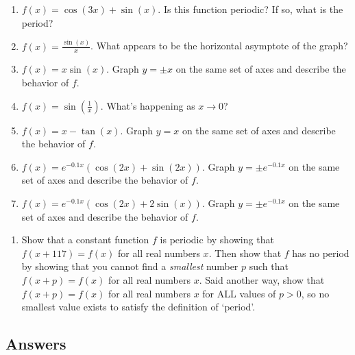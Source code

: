 \begin{enumerate}

\setcounter{enumi}{\value{HW}}

\item  $f(x) = \cos(3x) + \sin(x)$.  Is this function periodic?  If so, what is the period? \label{exploregraphsfirst}
\item  $f(x) = \frac{\sin(x)}{x}$.  What appears to be the horizontal asymptote of the graph? 
\item  $f(x) = x \sin(x)$.  Graph $y = \pm x$ on the same set of axes and describe the behavior of $f$. 
\item  $f(x) = \sin\left(\frac{1}{x}\right)$.  What's happening as $x \rightarrow 0$?
\item  $f(x) = x - \tan(x)$.  Graph $y = x$ on the same set of axes and describe the behavior of $f$.  
\item  $f(x) = e^{-0.1x} \left( \cos(2x) + \sin(2x)\right)$.  Graph $y = \pm e^{-0.1x}$ on the same set of axes and  describe the behavior of $f$.
\item  $f(x) = e^{-0.1x} \left( \cos(2x) + 2\sin(x)\right)$.  Graph $y = \pm e^{-0.1x}$ on the same set of axes and  describe the behavior of $f$. \label{exploregraphslast}

\setcounter{HW}{\value{enumi}}

\end{enumerate}

\begin{enumerate}

\setcounter{enumi}{\value{HW}}

\item Show that a constant function $f$ is periodic by showing that $f(x + 117) = f(x)$ for all real numbers $x$. Then show that $f$ has no period by showing that you cannot find a \emph{smallest} number $p$ such that $f(x + p) = f(x)$ for all real numbers $x$.  Said another way, show that $f(x + p) = f(x)$ for all real numbers $x$ for ALL values of $p > 0$, so no smallest value exists to satisfy the definition of `period'.

\setcounter{HW}{\value{enumi}}

\end{enumerate}

\newpage

\subsection{Answers}

